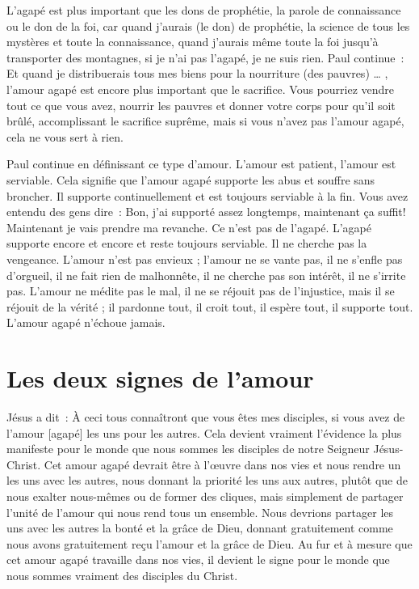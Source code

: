 L'agapé est plus important que les dons de prophétie,
 la parole de connaissance ou le don de la foi,
 car \og quand j'aurais (le don) de prophétie,
 la science de tous les mystères et toute la connaissance,
 quand j'aurais même toute la foi jusqu'à transporter des montagnes,
 si je n'ai pas l'agapé, je ne suis rien. \fg{} Paul continue~:
 \og Et quand je distribuerais tous mes biens
 pour la nourriture (des pauvres) \dots{} \fg{},
 l'amour agapé est encore plus important que le sacrifice.
 Vous pourriez vendre tout ce que vous avez, nourrir les pauvres
 et donner votre corps pour qu'il soit brûlé, accomplissant le sacrifice
 suprême, mais si vous n'avez pas l'amour agapé,
 cela ne vous sert à rien.

Paul continue en définissant ce type d'amour.
 \og L'amour est patient, l'amour est serviable. \fg{}
 Cela signifie que l'amour agapé supporte les abus et souffre sans broncher.
 Il supporte continuellement et est toujours serviable à la fin.
 Vous avez entendu des gens dire~:
 \og Bon, j'ai supporté assez longtemps, maintenant ça suffit!
 Maintenant je vais prendre ma revanche. \fg{}
 Ce n'est pas de l'agapé. L'agapé supporte encore et encore
 et reste toujours serviable. Il ne cherche pas la vengeance.
 \og L'amour n'est pas envieux ; l'amour ne se vante pas,
 il ne s'enfle pas d'orgueil, il ne fait rien de malhonnête,
 il ne cherche pas son intérêt, il ne s'irrite pas.
 L'amour ne médite pas le mal, il ne se réjouit pas de l'injustice,
 mais il se réjouit de la vérité ; il pardonne tout, il croit tout,
 il espère tout, il supporte tout. \fg{}
 L'amour agapé \og n'échoue jamais. \fg{}


\section{Les deux signes de l'amour}

Jésus a dit~:
 \og À ceci tous connaîtront que vous êtes mes disciples,
 si vous avez de l'amour [agapé] les uns pour les autres. \fg{}
 Cela devient vraiment l'évidence la plus manifeste pour le monde
 que nous sommes les disciples de notre Seigneur Jésus-Christ.
 Cet amour agapé devrait être à l'œuvre dans nos vies et nous rendre un
 les uns avec les autres, nous donnant la priorité les uns aux autres,
 plutôt que de nous exalter nous-mêmes ou de former des cliques,
 mais simplement de partager l'unité de l'amour qui nous rend
 tous un ensemble.
 Nous devrions partager les uns avec les autres la bonté et la grâce de Dieu,
 donnant gratuitement comme nous avons gratuitement reçu l'amour
 et la grâce de Dieu.
 Au fur et à mesure que cet amour agapé travaille dans nos vies,
 il devient le signe pour le monde que nous sommes vraiment
 des disciples du Christ.

